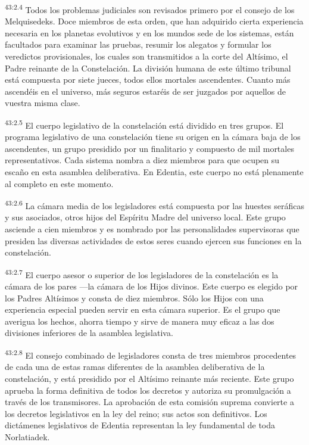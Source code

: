 \par
\textsuperscript{43:2.4} Todos los problemas judiciales son revisados primero por el consejo de los Melquisedeks. Doce miembros de esta orden, que han adquirido cierta experiencia necesaria en los planetas evolutivos y en los mundos sede de los sistemas, están facultados para examinar las pruebas, resumir los alegatos y formular los veredictos provisionales, los cuales son transmitidos a la corte del Altísimo, el Padre reinante de la Constelación. La división humana de este último tribunal está compuesta por siete jueces, todos ellos mortales ascendentes. Cuanto más ascendéis en el universo, más seguros estaréis de ser juzgados por aquellos de vuestra misma clase.

\par
\textsuperscript{43:2.5} El cuerpo legislativo de la constelación está dividido en tres grupos. El programa legislativo de una constelación tiene su origen en la cámara baja de los ascendentes, un grupo presidido por un finalitario y compuesto de mil mortales representativos. Cada sistema nombra a diez miembros para que ocupen su escaño en esta asamblea deliberativa. En Edentia, este cuerpo no está plenamente al completo en este momento.

\par
\textsuperscript{43:2.6} La cámara media de los legisladores está compuesta por las huestes seráficas y sus asociados, otros hijos del Espíritu Madre del universo local. Este grupo asciende a cien miembros y es nombrado por las personalidades supervisoras que presiden las diversas actividades de estos seres cuando ejercen sus funciones en la constelación.

\par
\textsuperscript{43:2.7} El cuerpo asesor o superior de los legisladores de la constelación es la cámara de los pares ---la cámara de los Hijos divinos. Este cuerpo es elegido por los Padres Altísimos y consta de diez miembros. Sólo los Hijos con una experiencia especial pueden servir en esta cámara superior. Es el grupo que averigua los hechos, ahorra tiempo y sirve de manera muy eficaz a las dos divisiones inferiores de la asamblea legislativa.

\par
\textsuperscript{43:2.8} El consejo combinado de legisladores consta de tres miembros procedentes de cada una de estas ramas diferentes de la asamblea deliberativa de la constelación, y está presidido por el Altísimo reinante más reciente. Este grupo aprueba la forma definitiva de todos los decretos y autoriza su promulgación a través de los transmisores. La aprobación de esta comisión suprema convierte a los decretos legislativos en la ley del reino; sus actos son definitivos. Los dictámenes legislativos de Edentia representan la ley fundamental de toda Norlatiadek.

